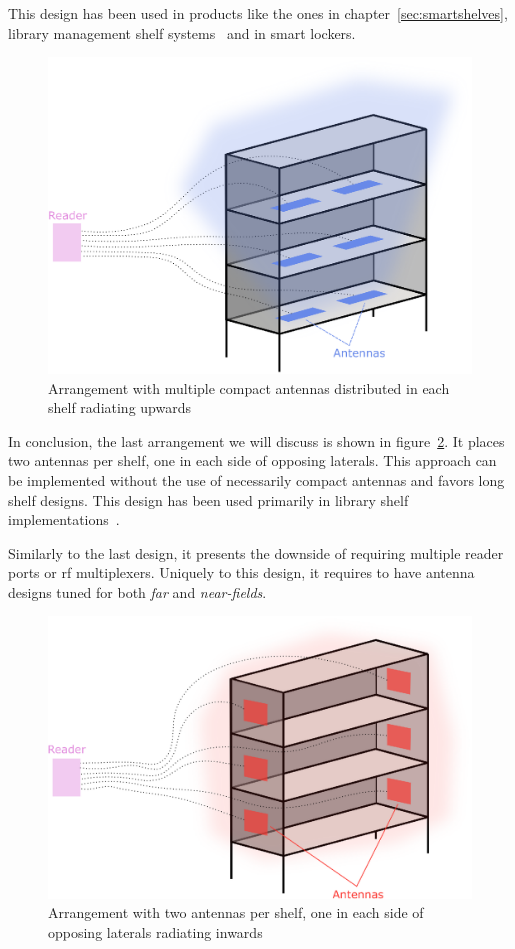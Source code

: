 This design has been used in products like the ones in chapter~\ref{sec:smartshelves}, library management shelf systems~\cite{markakisSafeEfficientDesign2014} and in smart lockers.

\begin{figure}[H]
    \centering
    \includegraphics[width=0.6\linewidth]{./figs/02-state-of-the-art/position2_1.eps}
    \caption{Arrangement with multiple compact antennas distributed in each shelf radiating upwards} 
    \label{fig:position2}
\end{figure}

In conclusion, the last arrangement we will discuss is shown in figure~\ref{fig:position3}. It places two antennas per shelf, one in each side of opposing laterals. This approach can be implemented without the use of necessarily compact antennas and favors long shelf designs.
This design has been used primarily in library shelf implementations~\cite{markakisRFIDenabledLibraryManagement2013}.

Similarly to the last design, it presents the downside of requiring multiple reader ports or \ac{rf} multiplexers. Uniquely to this design, it requires to have antenna designs tuned for both \emph{far} and \emph{near-fields}.

\begin{figure}[H]
    \centering
    \includegraphics[width=0.6\linewidth]{./figs/02-state-of-the-art/position3.eps}
    \caption{Arrangement with two antennas per shelf, one in each side of opposing laterals radiating inwards} 
    \label{fig:position3}
\end{figure}

